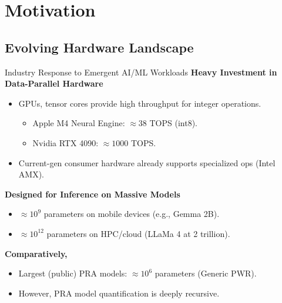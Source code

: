 \section{Motivation}
\subsection{Evolving Hardware Landscape}

\begin{frame}{Industry Response to Emergent AI/ML Workloads}
\textbf{Heavy Investment in Data-Parallel Hardware}
  \begin{itemize} 
    \item GPUs, tensor cores provide high throughput for integer operations.
    \begin{itemize}
    \item{Apple M4 Neural Engine: $\approx 38$ TOPS (int8)}.
    \item{Nvidia RTX 4090: $\approx 1000$ TOPS}.
    \end{itemize}
    \item Current-gen consumer hardware already supports specialized ops (Intel AMX).
  \end{itemize}
  \vspace{8pt}
\textbf{Designed for Inference on Massive Models}
  \begin{itemize} 
    \item $\approx10^9$ parameters on mobile devices (e.g., Gemma 2B).
    \item $\approx10^{12}$ parameters on HPC/cloud (LLaMa 4 at 2 trillion).
  \end{itemize}
  \vspace{8pt}
\textbf{Comparatively,}
  \begin{itemize} 
    \item Largest (public) PRA models: $\approx10^6$ parameters (Generic PWR).
    \item However, PRA model quantification is deeply recursive.
  \end{itemize}

\end{frame}